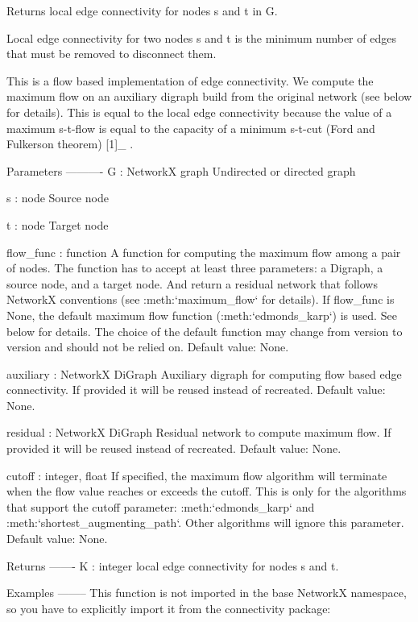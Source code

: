 \begin{DoxyVerb}Returns local edge connectivity for nodes s and t in G.

Local edge connectivity for two nodes s and t is the minimum number
of edges that must be removed to disconnect them.

This is a flow based implementation of edge connectivity. We compute the
maximum flow on an auxiliary digraph build from the original
network (see below for details). This is equal to the local edge
connectivity because the value of a maximum s-t-flow is equal to the
capacity of a minimum s-t-cut (Ford and Fulkerson theorem) [1]_ .

Parameters
----------
G : NetworkX graph
    Undirected or directed graph

s : node
    Source node

t : node
    Target node

flow_func : function
    A function for computing the maximum flow among a pair of nodes.
    The function has to accept at least three parameters: a Digraph,
    a source node, and a target node. And return a residual network
    that follows NetworkX conventions (see :meth:`maximum_flow` for
    details). If flow_func is None, the default maximum flow function
    (:meth:`edmonds_karp`) is used. See below for details. The
    choice of the default function may change from version
    to version and should not be relied on. Default value: None.

auxiliary : NetworkX DiGraph
    Auxiliary digraph for computing flow based edge connectivity. If
    provided it will be reused instead of recreated. Default value: None.

residual : NetworkX DiGraph
    Residual network to compute maximum flow. If provided it will be
    reused instead of recreated. Default value: None.

cutoff : integer, float
    If specified, the maximum flow algorithm will terminate when the
    flow value reaches or exceeds the cutoff. This is only for the
    algorithms that support the cutoff parameter: :meth:`edmonds_karp`
    and :meth:`shortest_augmenting_path`. Other algorithms will ignore
    this parameter. Default value: None.

Returns
-------
K : integer
    local edge connectivity for nodes s and t.

Examples
--------
This function is not imported in the base NetworkX namespace, so you
have to explicitly import it from the connectivity package:


\end{DoxyVerb}
